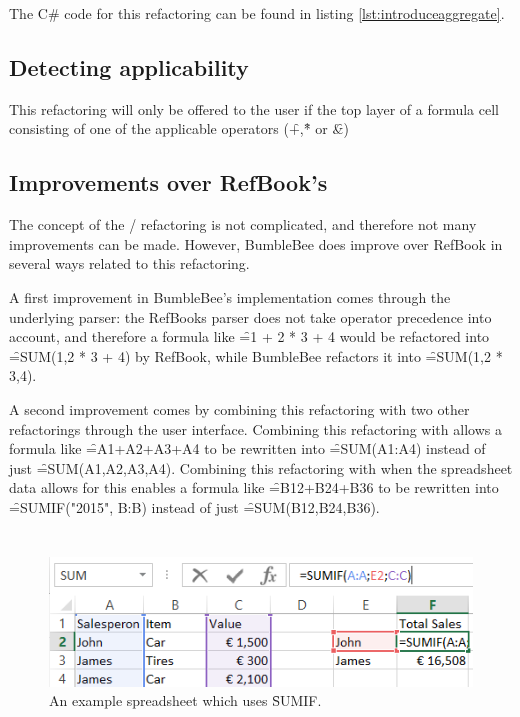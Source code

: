 The C\# code for this refactoring can be found in listing \ref{lst:introduceaggregate}.

\subsection{Detecting applicability}

This refactoring will only be offered to the user if the top layer of a formula cell consisting of one of the applicable operators (\f{+},\f{*} or \f{\&})

\newpage

\subsection{Improvements over RefBook's }

The concept of the / refactoring is not complicated, and therefore not many improvements can be made.
However, BumbleBee does improve over RefBook in several ways related to this refactoring.

A first improvement in BumbleBee's implementation comes through the underlying parser: the RefBooks parser does not take operator precedence into account, and therefore a formula like \f{=1 + 2 * 3 + 4} would be refactored into \f{=SUM(1,2 * 3 + 4)} by RefBook, while BumbleBee refactors it into \f{=SUM(1,2 * 3,4)}.

A second improvement comes by combining this refactoring with two other refactorings through the user interface.
Combining this refactoring with  allows a formula like \f{=A1+A2+A3+A4} to be rewritten into \f{=SUM(A1:A4)} instead of just \f{=SUM(A1,A2,A3,A4)}.
Combining this refactoring with  when the spreadsheet data allows for this enables a formula like \f{=B12+B24+B36} to be rewritten into \f{=SUMIF("2015", B:B)} instead of just \f{=SUM(B12,B24,B36)}.

\clearpage

\section{}
\label{refac:introduceconditionalaggregate}

\begin{figure}
	\centering
	\includegraphics{implementation/aggregate/sumifexample}
	\caption{An example spreadsheet which uses \f{SUMIF}.}
	\label{fig:sumifexample}
\end{figure}

